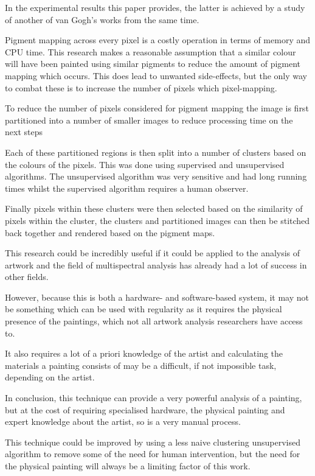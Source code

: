 \documentclass[conference]{IEEEtran}
\begin{document}
In the experimental results this paper provides, the latter is achieved by a
study of another of van Gogh's works from the same time.

Pigment mapping across every pixel is a costly operation in terms of memory and
CPU time. This research makes a reasonable assumption that a similar colour
will have been painted using similar pigments to reduce the amount of pigment
mapping which occurs. This does lead to unwanted side-effects, but the only way
to combat these is to increase the number of pixels which pixel-mapping.

To reduce the number of pixels considered for pigment mapping the image is
first partitioned into a number of smaller images to reduce processing time on
the next steps

Each of these partitioned regions is then split into a number of clusters based
on the colours of the pixels. This was done using supervised and unsupervised
algorithms. The unsupervised algorithm was very sensitive and had long running
times whilst the supervised algorithm requires a human observer.

Finally pixels within these clusters were then selected based on the similarity
of pixels within the cluster, the clusters and partitioned images can then be
stitched back together and rendered based on the pigment maps.

This research could be incredibly useful if it could be applied to the analysis
of artwork and the field of multispectral analysis has already had a lot of
success in other fields.

However, because this is both a hardware- and software-based system, it may not
be something which can be used with regularity as it requires the physical
presence of the paintings, which not all artwork analysis researchers have
access to.

It also requires a lot of a priori knowledge of the artist and calculating the
materials a painting consists of may be a difficult, if not impossible task,
depending on the artist.

In conclusion, this technique can provide a very powerful analysis of a
painting, but at the cost of requiring specialised hardware, the physical
painting and expert knowledge about the artist, so is a very manual process.

This technique could be improved by using a less naive clustering unsupervised
algorithm to remove some of the need for human intervention, but the need for
the physical painting will always be a limiting factor of this work.
\end{document}
